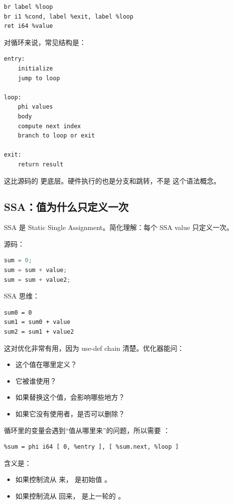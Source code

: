 \begin{lstlisting}
br label %loop
br i1 %cond, label %exit, label %loop
ret i64 %value
\end{lstlisting}

对循环来说，常见结构是：

\begin{lstlisting}
entry:
    initialize
    jump to loop

loop:
    phi values
    body
    compute next index
    branch to loop or exit

exit:
    return result
\end{lstlisting}

这比源码的  更底层。硬件执行的也是分支和跳转，不是  这个语法概念。

\subsection{SSA：值为什么只定义一次}

SSA 是 Static Single Assignment。简化理解：每个 SSA value 只定义一次。

源码：

\begin{lstlisting}[language=C++]
sum = 0;
sum = sum + value;
sum = sum + value2;
\end{lstlisting}

SSA 思维：

\begin{lstlisting}
sum0 = 0
sum1 = sum0 + value
sum2 = sum1 + value2
\end{lstlisting}

这对优化非常有用，因为 use-def chain 清楚。优化器能问：

\begin{itemize}
  \item 这个值在哪里定义？
  \item 它被谁使用？
  \item 如果替换这个值，会影响哪些地方？
  \item 如果它没有使用者，是否可以删除？
\end{itemize}

循环里的变量会遇到“值从哪里来”的问题，所以需要 ：

\begin{lstlisting}
%sum = phi i64 [ 0, %entry ], [ %sum.next, %loop ]
\end{lstlisting}

含义是：

\begin{itemize}
  \item 如果控制流从  来， 是初始值 。
  \item 如果控制流从  回来， 是上一轮的 。
\end{itemize}

